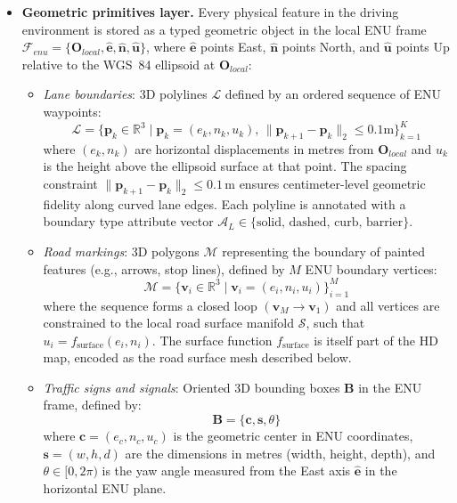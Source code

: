 \documentclass{book}
\begin{document}
\begin{itemize}
    \item \textbf{Geometric primitives layer.} Every physical feature
    in the driving environment is stored as a typed geometric object
    in the local ENU frame
    $\mathcal{F}_{enu} = \{ \mathbf{O}_{local}, \mathbf{\hat{e}},
    \mathbf{\hat{n}}, \mathbf{\hat{u}} \}$, where $\mathbf{\hat{e}}$
    points East, $\mathbf{\hat{n}}$ points North, and $\mathbf{\hat{u}}$
    points Up relative to the WGS~84 ellipsoid at $\mathbf{O}_{local}$:

    \begin{itemize}
        \item \emph{Lane boundaries}: 3D polylines $\mathcal{L}$
        defined by an ordered sequence of ENU waypoints:
        $$\mathcal{L} = \{ \mathbf{p}_k \in \mathbb{R}^3 \mid
        \mathbf{p}_k = (e_k, n_k, u_k),\,
        \|\mathbf{p}_{k+1} - \mathbf{p}_k\|_2 \leq 0.1\text{m}
        \}_{k=1}^{K}$$
        where $(e_k, n_k)$ are horizontal displacements in metres
        from $\mathbf{O}_{local}$ and $u_k$ is the height above the
        ellipsoid surface at that point.  The spacing constraint
        $\|\mathbf{p}_{k+1} - \mathbf{p}_k\|_2 \leq 0.1$\,m ensures
        centimeter-level geometric fidelity along curved lane edges.
        Each polyline is annotated with a boundary type attribute
        vector $\mathcal{A}_L \in
        \{\text{solid, dashed, curb, barrier}\}$.

        \item \emph{Road markings}: 3D polygons $\mathcal{M}$
        representing the boundary of painted features (e.g., arrows,
        stop lines), defined by $M$ ENU boundary vertices:
        $$\mathcal{M} = \{ \mathbf{v}_i \in \mathbb{R}^3 \mid
        \mathbf{v}_i = (e_i, n_i, u_i) \}_{i=1}^{M}$$
        where the sequence forms a closed loop
        $(\mathbf{v}_M \to \mathbf{v}_1)$ and all vertices are
        constrained to the local road surface manifold $\mathcal{S}$,
        such that $u_i = f_{\text{surface}}(e_i, n_i)$.  The surface
        function $f_{\text{surface}}$ is itself part of the HD map,
        encoded as the road surface mesh described below.

        \item \emph{Traffic signs and signals}: Oriented 3D bounding
        boxes $\mathbf{B}$ in the ENU frame, defined by:
        $$\mathbf{B} = \{ \mathbf{c}, \mathbf{s}, \theta \}$$
        where $\mathbf{c} = (e_c, n_c, u_c)$ is the geometric center
        in ENU coordinates, $\mathbf{s} = (w, h, d)$ are the
        dimensions in metres (width, height, depth), and
        $\theta \in [0, 2\pi)$ is the yaw angle measured from the
        East axis $\mathbf{\hat{e}}$ in the horizontal ENU plane.


\end{itemize}
\end{itemize}
\end{document}
